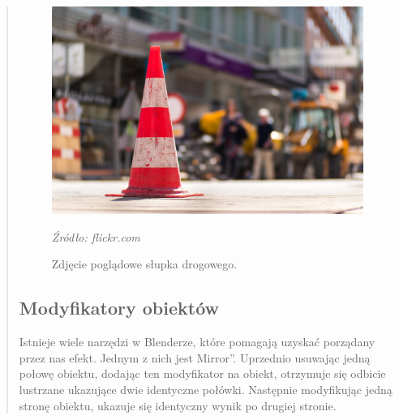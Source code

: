 \begin{quotation}
\begin{figure}[!hbt]
\centering
  \includegraphics[width=1\linewidth]{coneref.jpg}
  \caption{Zdjęcie poglądowe słupka drogowego.}\label{rys_4}
  \begin{minipage}[t]{0.75\linewidth}
    \emph{Źródło: flickr.com}
  \end{minipage}
\end{figure}




\newpage
\subsection{Modyfikatory obiektów}
\indent Istnieje wiele narzędzi w Blenderze, które pomagają uzyskać porządany przez nas efekt. Jednym z nich jest Mirror''. Uprzednio usuwając jedną połowę obiektu, dodając ten modyfikator na obiekt, otrzymuje się odbicie lustrzane ukazujące dwie identyczne połówki. Następnie modyfikując jedną stronę obiektu, ukazuje się identyczny wynik po drugiej stronie.


\end{quotation}
